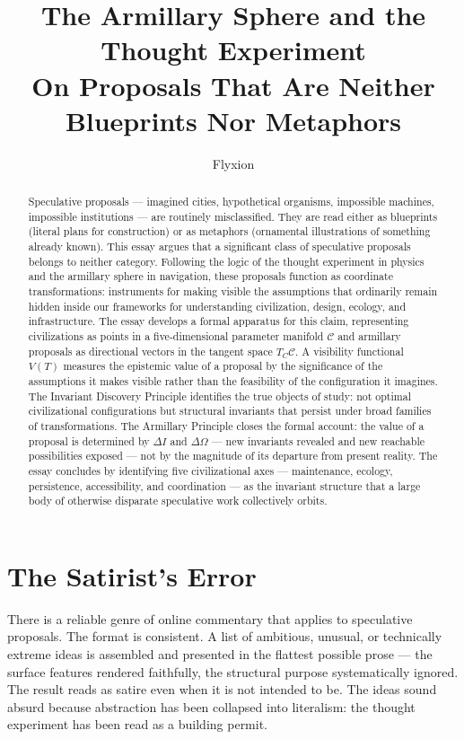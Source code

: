\documentclass[12pt, a4paper]{article}
\title{%
  \textbf{The Armillary Sphere and the Thought Experiment}\\[0.4em]
  \large On Proposals That Are Neither Blueprints Nor Metaphors
}
\author{Flyxion}
\date{}
\theoremstyle{named}
\begin{document}
\maketitle
\thispagestyle{empty}

\begin{abstract}
Speculative proposals — imagined cities, hypothetical organisms,
impossible machines, impossible institutions — are routinely
misclassified. They are read either as blueprints (literal plans for
construction) or as metaphors (ornamental illustrations of something
already known). This essay argues that a significant class of
speculative proposals belongs to neither category. Following the logic
of the thought experiment in physics and the armillary sphere in
navigation, these proposals function as coordinate transformations:
instruments for making visible the assumptions that ordinarily remain
hidden inside our frameworks for understanding civilization, design,
ecology, and infrastructure. The essay develops a formal apparatus for
this claim, representing civilizations as points in a five-dimensional
parameter manifold $\mathcal{C}$ and armillary proposals as directional
vectors in the tangent space $T_C\mathcal{C}$. A visibility functional
$V(T)$ measures the epistemic value of a proposal by the significance
of the assumptions it makes visible rather than the feasibility of the
configuration it imagines. The Invariant Discovery Principle identifies
the true objects of study: not optimal civilizational configurations but
structural invariants that persist under broad families of
transformations. The Armillary Principle closes the formal account:
the value of a proposal is determined by $\Delta I$ and $\Delta\Omega$
— new invariants revealed and new reachable possibilities exposed —
not by the magnitude of its departure from present reality. The essay
concludes by identifying five civilizational axes — maintenance,
ecology, persistence, accessibility, and coordination — as the
invariant structure that a large body of otherwise disparate speculative
work collectively orbits.
\end{abstract}

\newpage
\tableofcontents
\newpage

\section{The Satirist's Error}

There is a reliable genre of online commentary that applies to
speculative proposals. The format is consistent. A list of ambitious,
unusual, or technically extreme ideas is assembled and presented in the
flattest possible prose — the surface features rendered faithfully, the
structural purpose systematically ignored. The result reads as satire
even when it is not intended to be. The ideas sound absurd because
abstraction has been collapsed into literalism: the thought experiment
has been read as a building permit.
\end{document}
